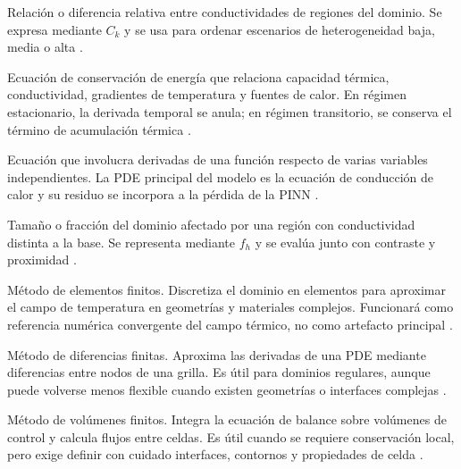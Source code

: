 \documentclass[11pt,a4paper,oneside]{report}
\begin{document}
\begin{description}[style=nextline,itemsep=0.5\baselineskip,parsep=0pt,topsep=0.25\baselineskip]
  \item[Contraste de conductividad.] Relación o diferencia relativa entre conductividades de regiones del dominio. Se expresa mediante $C_k$ y se usa para ordenar escenarios de heterogeneidad baja, media o alta \parencites{farouki1981thermal,devries1966thermal}[1,6--9]{khumalo2025}[1,10,16]{kim2025}.

  \item[Ecuación de conducción de calor.] Ecuación de conservación de energía que relaciona capacidad térmica, conductividad, gradientes de temperatura y fuentes de calor. En régimen estacionario, la derivada temporal se anula; en régimen transitorio, se conserva el término de acumulación térmica \parencites{carslaw1959conduction,kakac2018heatConduction,hahn2012heatConduction}[1,3]{xing2023}[1,3,16]{pan2025}.

  \item[Ecuación diferencial en derivadas parciales o PDE.] Ecuación que involucra derivadas de una función respecto de varias variables independientes. La PDE principal del modelo es la ecuación de conducción de calor y su residuo se incorpora a la pérdida de la PINN \parencites[686--690]{raissi2019}[1--2]{lawal2022}.

  \item[Extensión de heterogeneidad.] Tamaño o fracción del dominio afectado por una región con conductividad distinta a la base. Se representa mediante $f_h$ y se evalúa junto con contraste y proximidad \parencites[4--6]{enescu2021}[1,6--9]{khumalo2025}[1,10,16]{kim2025}.

  \item[FEM.] Método de elementos finitos. Discretiza el dominio en elementos para aproximar el campo de temperatura en geometrías y materiales complejos. Funcionará como referencia numérica convergente del campo térmico, no como artefacto principal \parencites[4--6]{enescu2021}{patankar1980numerical}[3--4,93--99]{cigre2025}.

  \item[FDM.] Método de diferencias finitas. Aproxima las derivadas de una PDE mediante diferencias entre nodos de una grilla. Es útil para dominios regulares, aunque puede volverse menos flexible cuando existen geometrías o interfaces complejas \parencites{patankar1980numerical}[3--4,93--99]{cigre2025}.

  \item[FVM.] Método de volúmenes finitos. Integra la ecuación de balance sobre volúmenes de control y calcula flujos entre celdas. Es útil cuando se requiere conservación local, pero exige definir con cuidado interfaces, contornos y propiedades de celda \parencite{patankar1980numerical}.


\end{description}
\end{document}
